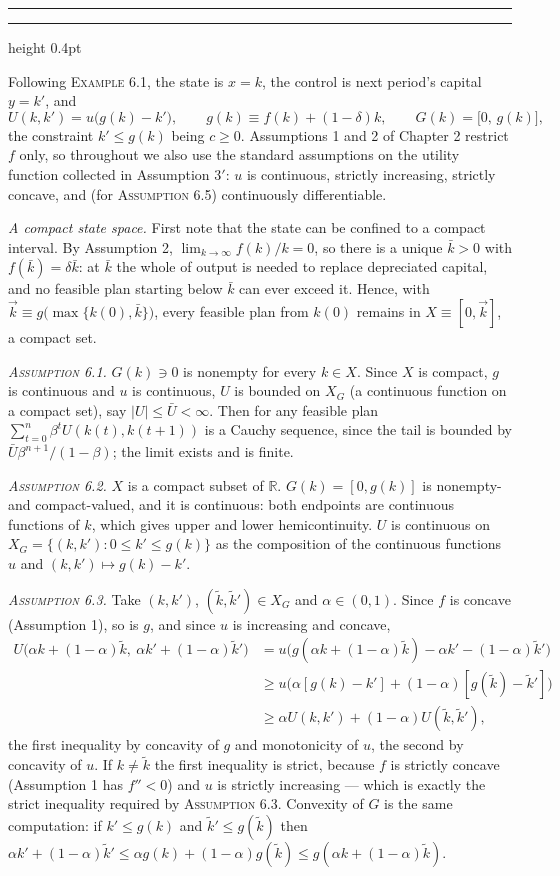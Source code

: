 \documentclass[11pt,letterpaper,reqno]{amsart}
\makeatletter
\newcommand{\R}{\mathbb{R}}
\newcommand{\as@head}[3]{%
  \par\addvspace{1.6ex}\penalty-200\relax
  \phantomsection
  \addcontentsline{toc}{subsection}{#1 #2\texorpdfstring{\ifx\relax#3\relax\else\quad #3\fi}{}}%
  {\color{RuleGrey}\hrule height 0.4pt}%
  \nobreak\vspace{0.8ex}\nobreak
  \noindent{\bfseries #1 #2}%
  \ifx\relax#3\relax\else\quad{\bfseries\itshape #3}\fi
  \par\nobreak\vspace{0.4ex}\nobreak
  \as@beginstatement
}
\newcommand{\as@beginstatement}{\begingroup\itshape\ignorespaces}
\newenvironment{aex}[2]{\as@head{Exercise}{#1}{#2}}{\par\addvspace{1.2ex}}
\newcommand{\bk}[1]{\textup{\textsc{#1}}}
\renewcommand{\as@beginstatement}{\ignorespaces}
\makeatother
\begin{document}
\bigskip
\hrule
\bigskip

\begin{aex}{6.1}{}
Following \bk{Example 6.1}, the state is $x=k$, the control is next period's capital $y=k'$, and
\[
U(k,k')=u\bigl(g(k)-k'\bigr),
\qquad
g(k)\equiv f(k)+(1-\delta)k,
\qquad
G(k)=\bigl[0,\,g(k)\bigr],
\]
the constraint $k'\le g(k)$ being $c\ge0$.  Assumptions 1 and 2 of Chapter 2 restrict $f$ only, so
throughout we also use the standard assumptions on the utility function collected in Assumption 3$'$: $u$
is continuous, strictly increasing, strictly concave, and (for \bk{Assumption 6.5}) continuously
differentiable.

\emph{A compact state space.}  First note that the state can be confined to a compact interval.  By
Assumption 2, $\lim_{k\to\infty}f(k)/k=0$, so there is a unique $\bar k>0$ with $f(\bar k)=\delta\bar k$:
at $\bar k$ the whole of output is needed to replace depreciated capital, and no feasible plan starting
below $\bar k$ can ever exceed it.  Hence, with
$\vec k\equiv g\bigl(\max\{k(0),\bar k\}\bigr)$, every feasible plan from $k(0)$ remains in
$X\equiv[0,\vec k]$, a compact set.

\emph{\bk{Assumption 6.1}.}  $G(k)\ni0$ is nonempty for every $k\in X$.  Since $X$ is compact, $g$ is
continuous and $u$ is continuous, $U$ is bounded on $X_G$ (a continuous function on a compact set), say
$|U|\le\bar U<\infty$.  Then for any feasible plan $\sum_{t=0}^{n}\beta^{t}U(k(t),k(t+1))$ is a Cauchy
sequence, since the tail is bounded by $\bar U\beta^{n+1}/(1-\beta)$; the limit exists and is finite.

\emph{\bk{Assumption 6.2}.}  $X$ is a compact subset of $\R$.  $G(k)=[0,g(k)]$ is nonempty- and
compact-valued, and it is continuous: both endpoints are continuous functions of $k$, which gives upper and
lower hemicontinuity.  $U$ is continuous on $X_G=\{(k,k'):0\le k'\le g(k)\}$ as the composition of the
continuous functions $u$ and $(k,k')\mapsto g(k)-k'$.

\emph{\bk{Assumption 6.3}.}  Take $(k,k')$, $(\tilde k,\tilde k')\in X_G$ and $\alpha\in(0,1)$.  Since $f$
is concave (Assumption 1), so is $g$, and since $u$ is increasing and concave,
\begin{align*}
U\bigl(\alpha k+(1-\alpha)\tilde k,\ \alpha k'+(1-\alpha)\tilde k'\bigr)
&=u\bigl(g(\alpha k+(1-\alpha)\tilde k)-\alpha k'-(1-\alpha)\tilde k'\bigr)\\
&\ge u\bigl(\alpha[g(k)-k']+(1-\alpha)[g(\tilde k)-\tilde k']\bigr)\\
&\ge\alpha U(k,k')+(1-\alpha)U(\tilde k,\tilde k') ,
\end{align*}
the first inequality by concavity of $g$ and monotonicity of $u$, the second by concavity of $u$.  If
$k\neq\tilde k$ the first inequality is strict, because $f$ is strictly concave (Assumption 1 has
$f''<0$) and $u$ is strictly increasing --- which is exactly the strict inequality required by
\bk{Assumption 6.3}.  Convexity of $G$ is the same computation: if $k'\le g(k)$ and $\tilde k'\le g(\tilde
k)$ then $\alpha k'+(1-\alpha)\tilde k'\le\alpha g(k)+(1-\alpha)g(\tilde k)\le g(\alpha k+(1-\alpha)\tilde
k)$.


\end{aex}
\end{document}
